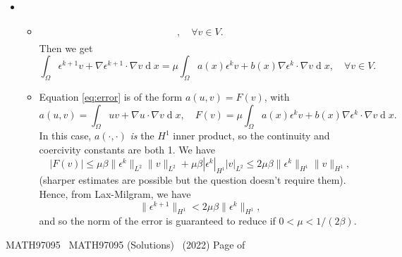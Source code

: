 \documentclass[11pt]{article}
\newcommand{\coursenum}{MATH97095} %
\newcommand{\coursename}{MATH97095 (Solutions)}
\renewcommand{\pagetotal}{\pageref{pagetot}}     %
\newcommand{\examyear}{2022}%
\newcommand{\marb}[1]{\marginpar{~~\fbox{\,\mathstrut #1\,}}}
\newcommand{\marbup}[1]{\vspace*{-4mm} \par \marb{#1}}
\newcommand{\unseen}{\marbup{{\small unseen $\Downarrow$}}}
\DeclareMathOperator{\diff}{d}
\newcounter{count_marks}
\newcounter{count_amarks}
\newcounter{count_bmarks}
\newcounter{count_cmarks}
\newcounter{count_dmarks}
\newcounter{count_mmarks} %
\newcommand{\bmarks}[1]{\addtocounter{count_marks}{#1} \addtocounter{count_bmarks}{#1}\marginpar{~~\fbox{\,\mathstrut #1, B}}}
\newcommand{\dmarks}[1]{\addtocounter{count_marks}{#1} \addtocounter{count_dmarks}{#1}\marginpar{~~\fbox{\,\mathstrut #1, D}}}
\newenvironment{Question}[1] 
 {\begin{itemize} \item[\large #1.~~]}{\end{itemize}\vfill
}
\newenvironment{Part}[1] 
 {\begin{itemize} \item[(#1)~~]}{\end{itemize}}
\newcommand{\EndPage}{\vfill \coursenum ~ \coursename ~
 (\examyear) \hfill Page \thepage\/ of \pagetotal \newpage}
\begin{document}
\begin{Question}{4}
\begin{Part}{b}
\begin{align}
\begin{split}
            , \quad
            \forall v \in V.
            \end{split}
          \end{align}
          Then we get
          \begin{equation}
    \int_\Omega \epsilon^{k+1}v + \nabla \epsilon^{k+1} \cdot \nabla v \diff x = 
\mu
\int_\Omega a(x) \epsilon^kv + b(x)\nabla \epsilon^k \cdot \nabla v \diff x
    , \quad
\forall v \in V.
\label{eq:error}
          \end{equation}
  \bmarks{6}
\end{Part}
  \begin{Part}{c}\unseen
    Equation \eqref{eq:error} is of the form $a(u,v) = F(v)$,
    with
    \begin{equation}
      a(u,v) = \int_\Omega uv + \nabla u\cdot\nabla v \diff x,
      \quad F(v) = \mu\int_\Omega a(x)\epsilon^k v + b(x)\nabla\epsilon^k
      \cdot \nabla v \diff x.
    \end{equation}
    In this case, $a(\cdot,\cdot)$ \emph{is} the $H^1$ inner product,
    so the continuity and coercivity constants are both 1.
    We have
    \begin{equation}
      |F(v)| \leq \mu\beta \|\epsilon^k\|_{L^2}\|v\|_{L^2}
      + \mu\beta |\epsilon^k|_{H^1}|v|_{L^2}
      \leq 2\mu\beta\|\epsilon^k\|_{H^1}\|v\|_{H^1},
    \end{equation}
    (sharper estimates are possible but the question doesn't require them).
    Hence, from Lax-Milgram, we have
    \begin{equation}
      \|\epsilon^{k+1}\|_{H^1} < 2\mu\beta\|\epsilon^k\|_{H^1},
    \end{equation}
    and so the norm of the error is guaranteed to reduce if $0<\mu<1/(2\beta)$.
  \dmarks{8}
\end{Part}
\end{Question}
	


\EndPage
\end{document}
